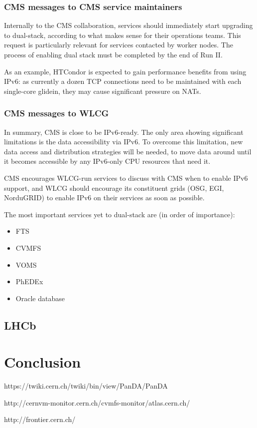 \documentclass[11pt]{article}
\begin{document}
\subsubsection{CMS messages to CMS service maintainers}
Internally to the CMS collaboration, services should immediately start
upgrading to dual-stack, according to what makes sense for their
operations teams. This request is particularly relevant for services
contacted by worker nodes. The process of enabling dual stack must be
completed by the end of Run II.

As an example, HTCondor is expected to gain performance benefits from
using IPv6: as currently a dozen TCP connections need to be maintained
with each single-core glidein, they may cause significant pressure on
NATs.

\subsubsection{CMS messages to WLCG}
In summary, CMS is close to be IPv6-ready. The only area showing
significant limitations is the data accessibility via IPv6. To
overcome this limitation, new data access and distribution strategies
will be needed, to move data around until it becomes accessible by any
IPv6-only CPU resources that need it.

CMS encourages WLCG-run services to discuss with CMS when to enable
IPv6 support, and WLCG should encourage its constituent grids (OSG,
EGI, NorduGRID) to enable IPv6 on their services as soon as possible.

The most important services yet to dual-stack are (in order of
importance):
\begin{itemize}
\item FTS
\item CVMFS
\item VOMS
\item PhEDEx
\item Oracle database
\end{itemize}

\subsection{LHCb}


\section{Conclusion}


\begin{thebibliography}{99}

 https://twiki.cern.ch/twiki/bin/view/PanDA/PanDA

 http://cernvm-monitor.cern.ch/cvmfs-monitor/atlas.cern.ch/

 http://frontier.cern.ch/

\end{thebibliography}
\end{document}
